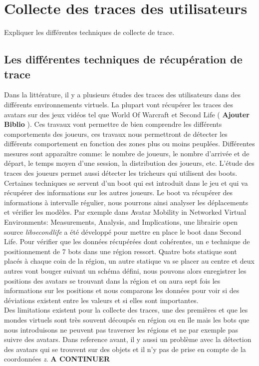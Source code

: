 \section{Collecte des traces des utilisateurs}
	Expliquer les différentes techniques de collecte de trace.
	\subsection{Les différentes techniques de récupération de trace}
	Dans la littérature, il y a plusieurs études des traces des utilisateurs dans des différents environnements virtuels. La plupart vont récupérer les traces des avatars sur des jeux vidéos tel que World Of Warcraft et Second Life ( \textbf{Ajouter Biblio} ). Ces travaux vont permettre de bien comprendre les différents comportements des joueurs, ces travaux nous permettront de détecter les différents comportement en fonction des zones plus ou moins peuplées. Différentes mesures sont apparaître comme: le nombre de joueurs, le nombre d'arrivée et de départ, le temps moyen d'une session, la distribution des joueurs, etc. L'étude des traces des joueurs permet aussi détecter les tricheurs qui utilisent des boots. \\
	
	Certaines techniques se servent d'un boot qui est introduit dans le jeu et qui va récupérer des informations sur les autres joueurs. Le boot va récupérer des informations à intervalle régulier, nous pourrons ainsi analyser les déplacements et vérifier les modèles. Par exemple dans {Avatar Mobility in Networked Virtual Environments: Measurements, Analysis, and Implications}, une librairie open source \textit{libsecondlife} a été développé pour mettre en place le boot dans Second Life. Pour vérifier que les données récupérées dont cohérentes, un e technique de positionnement de 7 bots dans une région ressort. Quatre bots statique sont placés à chaque coin de la région, un autre statique va se placer au centre et deux autres vont bouger suivant un schéma défini, nous pouvons alors enregistrer les positions des avatars se trouvant dans la région et on aura sept fois les informations sur les positions et nous comparons les données pour voir si des déviations existent entre les valeurs et si elles sont importantes.\\  
 	
	Des limitations existent pour la collecte des traces, une des premières et que les mondes virtuels sont très souvent découpés en région ou en île mais les bots que nous introduisons ne peuvent pas traverser les régions et ne par exemple pas suivre des avatars. Dans { reference avant}, il y aussi un problème avec la détection des avatars qui se trouvent sur des objets et il n'y pas de prise en compte de la coordonnées \textit{z}. \textbf{A CONTINUER}	

